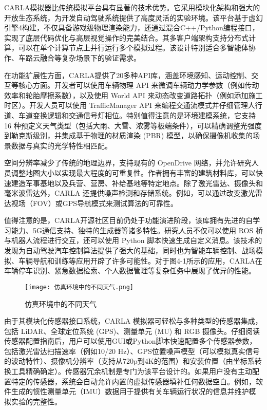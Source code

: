 CARLA模拟器比传统模拟平台具有显著的技术优势。它采用模块化架构和强大的开放生态系统，为开发自动驾驶系统提供了高度灵活的实验环境。该平台基于虚幻引擎4构建，不仅具备游戏级物理渲染能力，还通过混合C++/Python编程接口，实现了底层代码优化与高层视觉操作的完美结合。其多客户端架构支持分布式计算，可以在单个计算节点上并行运行多个模拟过程。该设计特别适合多智能体协作、车路云融合等复杂场景下的验证需求。

在功能扩展性方面，CARLA提供了20多种API库，涵盖环境感知、运动控制、交互等核心方面。开发者可以使用车辆物理 API 来微调车辆动力学参数（例如传动效率和轮胎摩擦系数），以及使用 World API 来动态改变道路拓扑（例如添加施工时区）。开发人员可以使用 TrafficManager API 来编程交通流模式并仔细管理人行道、车道变换逻辑和交通信号灯相位。特别值得注意的是环境建模系统，它支持 16 种预定义天气类型（包括大雨、大雪、浓雾等极端条件），可以精确调整光强度到勒克斯级别，并集成基于物理的材质渲染 (PBR) 模型，以确保摄像机收集的场景数据与真实的光学特性相匹配。

空间分辨率减少了传统的地理边界，支持现有的 OpenDrive 网络，并允许研究人员调整地图大小以实现最大程度的可重复性。作者拥有丰富的建筑材料库，可以快速建造军事基地以及兵营、营房、补给基地等特定地点。除了激光雷达、摄像头和毫米波雷达外，CARLA 还提供噪声检测和存储系统。例如，可以通过改变激光雷达视场（FOV）或GPS导航模式来测试算法的可靠性。

值得注意的是，CARLA开源社区目前仍处于功能演进阶段，该库拥有先进的自学习能力、5G通信支持、独特的生成器等诸多特性。研究人员不仅可以使用 ROS 桥与机器人流程进行交互，还可以使用 Python 脚本快速生成自定义消息。该技术的发现为自动驾驶汽车控制算法提供了强大的基础，同时也为智能车辆控制、战场模拟、车辆导航和训练等应用开辟了许多可能性。对于图4-1所示的应用，CARLA在车辆停车识别、紧急数据检索、个人数据管理等复杂任务中展现了优异的性能。

\begin{figure}[hbt]
	\centering
	\texttt{[image: 仿真环境中的不同天气.png]}
	\caption{仿真环境中的不同天气}
	\label{f.example}
\end{figure}

由于其模块化传感器接口系统，CARLA 模拟器可轻松与多种类型的传感器集成，包括 LiDAR、全球定位系统 (GPS)、测量单元 (MU) 和 RGB 摄像头。仔细阅读传感器配置指南后，用户可以使用GUI或Python脚本快速配置多个传感器参数，包括激光雷达扫描速率（例如10/20 Hz）、GPS位置噪声模型（可以模拟真实信号的波动特性）、摄像机分辨率（支持从720p到4K的范围）和安装位置（由坐标系转换工具精确确定）。传感器冗余机制是专门为该平台设计的。如果用户没有主动配置特定的传感器，系统会自动允许内置的虚拟传感器填补任何数据空白。例如，软件生成的惯性测量单元（IMU）数据用于提供有关车辆运行状况的信息并维护模拟实验的完整性。


